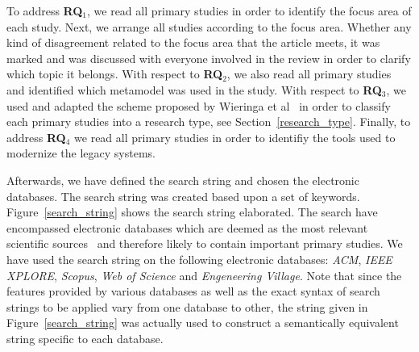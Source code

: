 


To address \textbf{RQ$_1$}, we read all primary studies in order to identify the focus area of each study. Next, we arrange all studies according to the focus area. Whether any kind of disagreement related to the focus area that the article meets, it was marked and was discussed with everyone involved in the review in order to clarify which topic it belongs. With respect to \textbf{RQ$_2$}, we also read all primary studies and identified which metamodel was used in the study. With respect to \textbf{RQ$_3$}, we used and adapted the scheme proposed by Wieringa et al~\cite{Wieringa:2005:REP:1107677.1107683} in order to classify each primary studies into a research type, see Section~\ref{research_type}. Finally, to address \textbf{RQ$_4$} we read all primary studies in order to identifiy the tools used to modernize the legacy systems. %


Afterwards, we have defined the search string and chosen the electronic databases. The search string was created based upon a set of keywords. Figure~\ref{search_string} shows the search string elaborated. The search have encompassed electronic databases which are deemed as the most relevant scientific sources~\cite{Kitchenham} and therefore likely to contain important primary studies. We have used the search string on the following electronic databases: \textit{ACM}, \textit{IEEE XPLORE}, \textit{Scopus}, \textit{Web of Science} and \textit{Engeneering Village}. Note that since the features provided by various databases as well as the exact syntax of search strings to be applied vary from one database to other, the string given in Figure~\ref{search_string} was actually used to construct a semantically equivalent string specific to each database.


